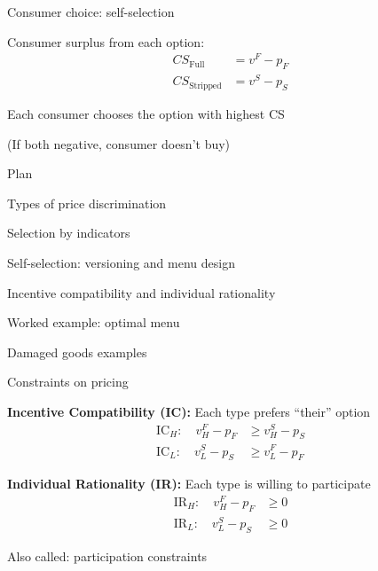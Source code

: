 \documentclass[notes,11pt, aspectratio=169]{beamer}
\newenvironment{wideitemize}{\itemize\addtolength{\itemsep}{10pt}}{\enditemize}
\newenvironment{wideenumerate}{\enumerate\addtolength{\itemsep}{10pt}}{\endenumerate}
\begin{document}
\begin{frame}{Consumer choice: self-selection}
	\begin{wideitemize}
		\item Consumer surplus from each option:
		\begin{align*}
			CS_{\text{Full}} &= v^F - p_F \\
			CS_{\text{Stripped}} &= v^S - p_S
		\end{align*}
		\item Each consumer chooses the option with highest CS
		\item (If both negative, consumer doesn't buy)
	\end{wideitemize}
\end{frame}

\begin{frame}{Plan}
  \begin{wideenumerate}
    \item Types of price discrimination
    \item Selection by indicators
    \item Self-selection: versioning and menu design
    \item Incentive compatibility and individual rationality
    \item Worked example: optimal menu
    \item Damaged goods examples
  \end{wideenumerate}
\end{frame}

\begin{frame}{Constraints on pricing}
	\begin{wideitemize}
		\item \textbf{Incentive Compatibility (IC):} Each type prefers ``their'' option
		\begin{align*}
			\text{IC}_H: \quad v_H^F - p_F &\geq v_H^S - p_S \\
			\text{IC}_L: \quad v_L^S - p_S &\geq v_L^F - p_F
		\end{align*}
		\item \textbf{Individual Rationality (IR):} Each type is willing to participate
		\begin{align*}
			\text{IR}_H: \quad v_H^F - p_F &\geq 0 \\
			\text{IR}_L: \quad v_L^S - p_S &\geq 0
		\end{align*}
		\item Also called: participation constraints
	\end{wideitemize}
\end{frame}
\end{document}
